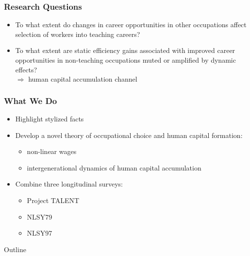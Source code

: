 \documentclass[11pt]{beamer}
\begin{document}
	\begin{frame}
		\frametitle{Research Questions}
		\vfill
		\begin{itemize}
			\item To what extent do changes in career opportunities in other occupations affect selection of workers into teaching careers?
			\vfill
			\item To what extent are static efficiency gains associated with improved career opportunities in non-teaching occupations muted or amplified by dynamic effects?\\
			$\Rightarrow$ human capital accumulation channel
		\end{itemize}
		\vfill
	\end{frame}
	
	\begin{frame}
		\frametitle{What We Do}
		\vfill
		\begin{itemize}
			\item Highlight stylized facts
			\vfill
			\item Develop a novel theory of occupational choice and human capital formation: 
			\begin{itemize}
				\item[$\circ$] non-linear wages %
				\item[$\circ$] intergenerational dynamics of human capital accumulation
			\end{itemize}
			\vfill
			\item Combine three longitudinal surveys: 
			\begin{itemize}
				\item[$\circ$] Project TALENT
				\item[$\circ$] NLSY79
				\item[$\circ$] NLSY97
            \end{itemize}
		\end{itemize}
		\vfill
	\end{frame}

 \begin{frame}{Outline}
\tableofcontents{}
\end{frame}
\end{document}
